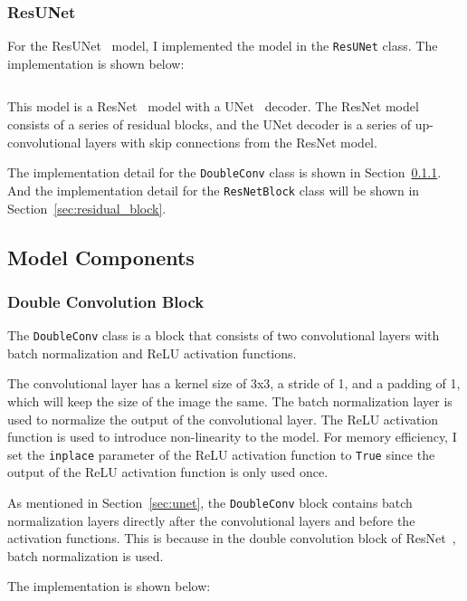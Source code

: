 \subsubsection{ResUNet}

For the ResUNet~\cite{ResUNet} model, I implemented the model in the \texttt{ResUNet} class. The implementation is shown below:

\inputminted[firstline=23]{python}{../src/models/resnet34_unet.py}

This model is a ResNet~\cite{ResNet} model with a UNet~\cite{UNet} decoder.
The ResNet model consists of a series of residual blocks, and the UNet decoder is a series of up-convolutional layers with skip connections from the ResNet model.

The implementation detail for the \texttt{DoubleConv} class is shown in Section~\ref{sec:double_conv}.
And the implementation detail for the \texttt{ResNetBlock} class will be shown in Section~\ref{sec:residual_block}.

\subsection{Model Components}

\subsubsection{Double Convolution Block}
\label{sec:double_conv}

The \texttt{DoubleConv} class is a block that consists of two convolutional layers with batch normalization and ReLU activation functions.

The convolutional layer has a kernel size of 3x3, a stride of 1, and a padding of 1, which will keep the size of the image the same.
The batch normalization layer is used to normalize the output of the convolutional layer.
The ReLU activation function is used to introduce non-linearity to the model.
For memory efficiency, I set the \texttt{inplace} parameter of the ReLU activation function to \texttt{True} since the output of the ReLU activation function is only used once.

As mentioned in Section~\ref{sec:unet}, the \texttt{DoubleConv} block contains batch normalization layers directly after the convolutional layers and before the activation functions.
This is because in the double convolution block of ResNet~\cite{ResNet}, batch normalization is used.

The implementation is shown below:

